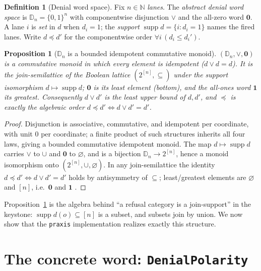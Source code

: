 \documentclass[11pt,oneside]{book}
\theoremstyle{definition}
\newtheorem{definition}{Definition}[chapter]
\theoremstyle{plain}
\newtheorem{proposition}[theorem]{Proposition}
\theoremstyle{remark}
\DeclareMathOperator{\supp}{supp}
\newcommand{\code}[1]{\texttt{#1}}
\newcommand{\Deny}{\mathbb{D}}                 %
\begin{document}
\begin{definition}[Denial word space]\label{def:denialabstract}
Fix $n\in\mathbb{N}$ \emph{lanes}. The \emph{abstract denial word space} is
$\Deny_n=\{0,1\}^{n}$ with componentwise disjunction $\lor$ and the all-zero word $\bm 0$.
A lane $i$ is \emph{set} in $d$ when $d_i=1$; the \emph{support} $\supp d=\{i:d_i=1\}$ names
the fired lanes. Write $d\preceq d'$ for the componentwise order $\forall i\, (d_i\le d_i')$.
\end{definition}

\begin{proposition}[$\Deny_n$ is a bounded idempotent commutative monoid]\label{prop:monoid}
$(\Deny_n,\lor,\bm 0)$ is a commutative monoid in which every element is idempotent
($d\lor d=d$). It is the join-semilattice of the Boolean lattice $(2^{[n]},\subseteq)$ under
the support isomorphism $d\mapsto\supp d$; $\bm 0$ is its least element (bottom), and the
all-ones word $\bm 1$ its greatest. Consequently $d\lor d'$ is the least upper bound of
$d,d'$, and $\preceq$ is exactly the algebraic order $d\preceq d'\iff d\lor d'=d'$.
\end{proposition}

\begin{proof}
Disjunction is associative, commutative, and idempotent per coordinate, with unit $0$ per
coordinate; a finite product of such structures inherits all four laws, giving a bounded
commutative idempotent monoid. The map $d\mapsto\supp d$ carries $\lor$ to $\cup$ and $\bm 0$
to $\varnothing$, and is a bijection $\Deny_n\to 2^{[n]}$, hence a monoid isomorphism onto
$(2^{[n]},\cup,\varnothing)$. In any join-semilattice the identity
$d\preceq d'\iff d\lor d'=d'$ holds by antisymmetry of $\subseteq$; least/greatest elements
are $\varnothing$ and $[n]$, i.e.\ $\bm 0$ and $\bm 1$
\cite[Ch.~I]{birkhoff1967}. \end{proof}

Proposition~\ref{prop:monoid} is the algebra behind ``a refusal category is a join-support''
in the keystone: $\supp d(o)\subseteq[n]$ is a subset, and subsets join by union. We now show
that the \code{praxis} implementation realizes exactly this structure.

\section{The concrete word: \texttt{DenialPolarity}}
\end{document}
